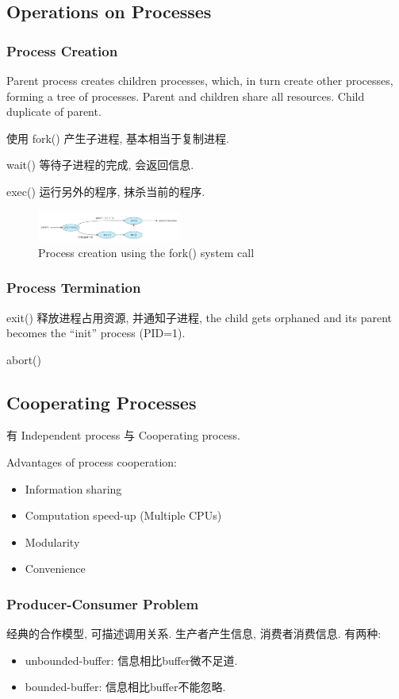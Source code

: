 \subsection{Operations on Processes}
\subsubsection{Process Creation}
Parent process creates children processes, which, in turn create other processes, forming a tree of processes. Parent and children share all resources. Child duplicate of parent. 

使用 fork() 产生子进程, 基本相当于复制进程. 

wait() 等待子进程的完成, 会返回信息.

exec() 运行另外的程序, 抹杀当前的程序. 

\begin{figure}[!htb]
    \centering
    \includegraphics[width=0.42\textwidth]{pic/OS3/fork.png}
    \caption{Process creation using the fork() system call}
\end{figure}

\subsubsection{Process Termination}
exit() 释放进程占用资源, 并通知子进程, the child gets orphaned and its parent becomes the ``init'' process (PID=1). 

abort()

\subsection{Cooperating Processes}
有 Independent process 与 Cooperating process. 

Advantages of process cooperation: 
\begin{itemize}
    \item Information sharing
    \item Computation speed-up (Multiple CPUs)
    \item Modularity
    \item Convenience
\end{itemize}

\subsubsection{Producer-Consumer Problem}
经典的合作模型, 可描述调用关系. 生产者产生信息, 消费者消费信息. 有两种:
\begin{itemize}
    \item unbounded-buffer: 信息相比buffer微不足道. 
    \item bounded-buffer: 信息相比buffer不能忽略. 
\end{itemize}

